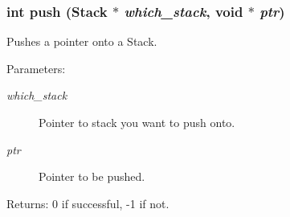\subsubsection{\setlength{\rightskip}{0pt plus 5cm}int push (\bf{Stack} $\ast$ {\em which\_\-stack}, void $\ast$ {\em ptr})}\label{stack_8c_006917f7e90d844cb8b0f14beee2d699}


Pushes a pointer onto a Stack. \begin{Desc}
\item[Parameters:]
\begin{description}
\item[{\em which\_\-stack}]Pointer to stack you want to push onto. \item[{\em ptr}]Pointer to be pushed. \end{description}
\end{Desc}
\begin{Desc}
\item[Returns:]0 if successful, -1 if not. \end{Desc}
